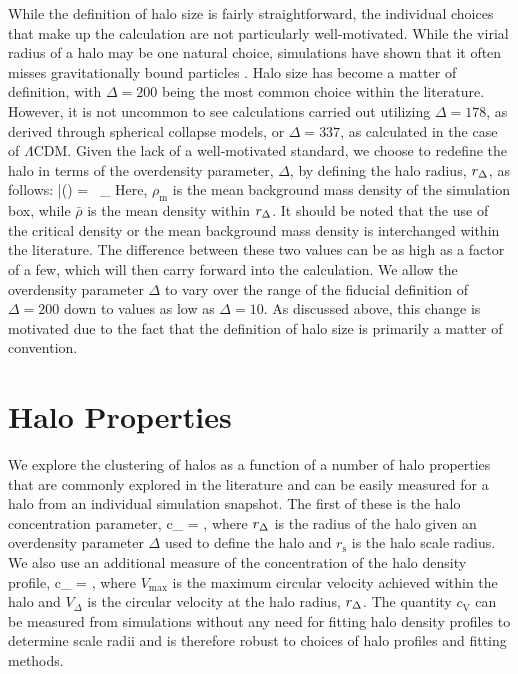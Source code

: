 \documentclass[usenatbib,usegraphicx,letterpaper]{mn2e}
\begin{document}
While the definition of halo size is fairly straightforward, the individual choices that make up the calculation are not particularly well-motivated. While the virial radius of a halo may be one natural choice, simulations have shown that it often misses gravitationally bound particles \citep*{kazan06}. Halo size has become a matter of definition, with $\Delta=200$ being the most common choice within the literature. However, it is not uncommon to see calculations carried out utilizing $\Delta = 178$, as derived through spherical collapse models, or $\Delta = 337$, as calculated in the case of $\Lambda\mathrm{CDM}$. Given the lack of a well-motivated standard, we choose to redefine the halo in terms of the overdensity parameter, $\Delta$, by defining the halo radius, $r_{\Delta}$, as follows:
\beq
	\bar{\rho}(\Rdel) = \Delta\, \rho_{}
\eeq
Here, $\rho_{\mathrm{m}}$ is the mean background mass density of the simulation box, while $\bar{\rho}$ is the mean density within $r_{\Delta}$. It should be noted that the use of the critical density or the mean background mass density is interchanged within the literature. The difference between these two values can be as high as a factor of a few, which will then carry forward into the calculation. We allow the overdensity parameter $\Delta$ to vary over the range of the fiducial definition of $\Delta = 200$ down to values as low as $\Delta = 10$. As discussed above, this change is motivated due to the fact that the definition of halo size is primarily a matter of convention.

\section{Halo Properties}
\label{section:haloprops}

We explore the clustering of halos as a function of a number of halo properties that are commonly explored in the 
literature and can be easily measured for a halo from an individual simulation snapshot. The first of these is the 
halo concentration parameter, 
\beq
c_{} = ,
\eeq
where $r_{\Delta}$ is the radius of the halo given an overdensity parameter $\Delta$ used to define the halo and 
$r_{\mathrm{s}}$ is the halo scale radius. 
We also use an additional measure of the concentration of the halo density profile, 
\beq
c_{} = , 
\eeq
where $V_{\mathrm{max}}$ is the maximum circular velocity achieved within the halo and $V_{\Delta}$ is the circular 
velocity at the halo radius, $r_{\Delta}$. The quantity $c_{\mathrm{V}}$ can be measured from simulations without 
any need for fitting halo density profiles to determine scale radii and is therefore robust to choices of halo profiles 
and fitting methods. 
\end{document}
